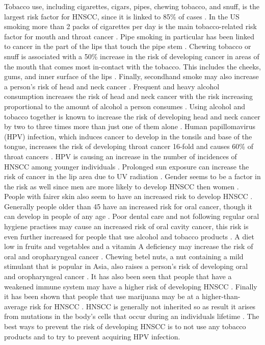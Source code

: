 \documentclass[\main/thesis.tex]{subfiles}
\begin{document}
Tobacco use, including cigarettes, cigars, pipes, chewing tobacco, and snuff, is the largest risk factor for HNSCC, since it is linked to 85\% of cases \cite{cancer.net_2021}. In the US smoking more than 2 packs of cigarettes per day is the main tobacco-related risk factor for mouth and throat cancer \cite{merckmanuals.com_2021}. Pipe smoking in particular has been linked to cancer in the part of the lips that touch the pipe stem \cite{merckmanuals.com_2021}. Chewing tobacco or snuff is associated with a 50\% increase in the risk of developing cancer in areas of the mouth that comes most in-contact with the tobacco. This includes the cheeks, gums, and inner surface of the lips \cite{merckmanuals.com_2021}. Finally, secondhand smoke may also increase a person's risk of head and neck cancer \cite{merckmanuals.com_2021}. Frequent and heavy alcohol consumption increases the risk of head and neck cancer with the risk increasing proportional to the amount of alcohol a person consumes \cite{merckmanuals.com_2021}. Using alcohol and tobacco together is known to increase the risk of developing head and neck cancer by two to three times more than just one of them alone \cite{merckmanuals.com_2021}. Human papillomavirus (HPV) infection, which induces cancer to develop in the tonsils and base of the tongue, increases the risk of developing throat cancer 16-fold and causes 60\% of throat cancers \cite{merckmanuals.com_2021}. HPV is causing an increase in the number of incidences of HNSCC among younger individuals \cite{merckmanuals.com_2021}. Prolonged sun exposure can increase the risk of cancer in the lip area due to UV radiation \cite{merckmanuals.com_2021}. Gender seems to be a factor in the risk as well since men are more likely to develop HNSCC then women \cite{merckmanuals.com_2021}. People with fairer skin also seem to have an increased risk to develop HNSCC \cite{cancer.net_2021}. Generally people older than 45 have an increased risk for oral cancer, though it can develop in people of any age \cite{cancer.net_2021}. Poor dental care and not following regular oral hygiene practises may cause an increased risk of oral cavity cancer, this risk is even further increased for people that use alcohol and tobacco products \cite{merckmanuals.com_2021}. A diet low in fruits and vegetables and a vitamin A deficiency may increase the risk of oral and oropharyngeal cancer \cite{cancer.net_2021}. Chewing betel nuts, a nut containing a mild stimulant that is popular in Asia, also raises a person's risk of developing oral and oropharyngeal cancer \cite{cancer.net_2021}. It has also been seen that people that have a weakened immune system may have a higher risk of developing HNSCC \cite{cancer.net_2021}. Finally it has been shown that people that use marijuana may be at a higher-than-average risk for HNSCC \cite{cancer.net_2021}. HNSCC is generally not inherited so as result it arises from mutations in the body's cells that occur during an individuals lifetime \cite{medlineplus.gov_2021}. The best ways to prevent the risk of developing HNSCC is to not use any tobacco products and to try to prevent acquiring HPV infection. 
\end{document}
